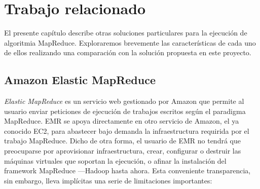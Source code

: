 \chapter{Trabajo relacionado}\label{cap:conclusiones}
\noindent El presente cap\'itulo describe otras soluciones particulares para la ejecuci\'on de algoritmia MapReduce. Exploraremos brevemente las caracter\'isticas de cada uno de ellos realizando una comparaci\'on con la soluci\'on propuesta en este proyecto.


\section{Amazon Elastic MapReduce}\label{sec:emc}
\noindent \emph{Elastic MapReduce} \cite{aws} es un servicio web gestionado por Amazon que permite al usuario enviar peticiones de ejecuci\'on de trabajos escritos seg\'un el paradigma MapReduce. EMR se apoya directamente en otro servicio de Amazon, el ya conocido EC2, para abastecer bajo demanda la infraestructura requirida por el trabajo MapReduce.
Dicho de otra forma, el usuario de EMR no tendr\'a que preocuparse por aprovisionar infraestructura, crear, con\-fi\-gu\-rar o destruir las m\'aquinas virtuales que soportan la ejecuci\'on, o afinar la instalaci\'on del framework MapReduce ---Hadoop hasta ahora. Esta conveniente transparencia, sin embargo, lleva impl\'icitas una serie de limitaciones importantes:


